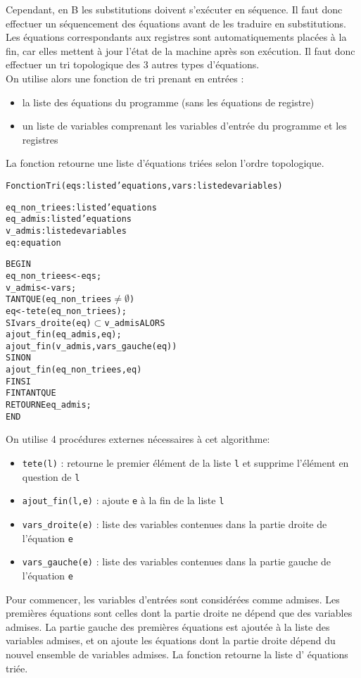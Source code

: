 Cependant, en B les substitutions doivent s'exécuter en séquence. Il faut donc
effectuer un séquencement des équations avant de les traduire en substitutions.
Les équations correspondants aux registres sont
automatiquements placées à la fin, car elles mettent à jour l'état de la machine
après son exécution. Il faut donc effectuer un tri topologique des 3 autres
types d'équations.\\
On utilise alors une fonction de tri prenant en entrées :
\begin{itemize}
\item la liste des équations du programme (sans les équations de registre)
\item un liste de variables comprenant les variables d'entrée du programme et
les registres 
\end{itemize}
La fonction retourne une liste d'équations triées selon l'ordre
topologique.
\newpage
\begin{alltt}
Fonction Tri (eqs: liste d'equations, vars: liste de variables)

eq\_non\_triees : liste d'equations
eq\_admis : liste d'equations
v\_admis : liste de variables 
eq : equation

BEGIN
 eq\_non\_triees <- eqs;
 v\_admis <- vars;
 TANT QUE (eq\_non\_triees \(\neq \emptyset \)) 
    eq <- tete(eq\_non\_triees);
    SI vars\_droite(eq) \(\subset\) v\_admis ALORS
       ajout\_fin(eq\_admis, eq);
       ajout\_fin(v\_admis, vars\_gauche(eq))
    SINON
       ajout\_fin(eq\_non\_triees, eq)
    FIN SI
 FIN TANT QUE
 RETOURNE eq\_admis;
END

\end{alltt}

On utilise 4 procédures externes nécessaires à cet algorithme:
\begin{itemize}
\item \texttt{tete(l)} : retourne le premier élément de la liste \texttt{l} et supprime l'élément
  en question de \texttt{l}
\item \texttt{ajout\_fin(l,e)} : ajoute \texttt{e} à la fin de la liste \texttt{l}
\item \texttt{vars\_droite(e)} : liste des variables contenues dans la partie droite de
  l'équation \texttt{e}
\item \texttt{vars\_gauche(e)} : liste des variables contenues dans la partie gauche de
  l'équation \texttt{e}
\end{itemize}
Pour commencer, les variables d'entrées sont considérées comme admises. Les
premières équations sont celles dont la partie droite ne dépend que des
variables admises. La partie gauche des premières équations est ajoutée à la
liste des variables admises, et on ajoute les équations dont la partie droite
dépend du nouvel ensemble de variables admises. La fonction retourne la liste d'
équations triée.


